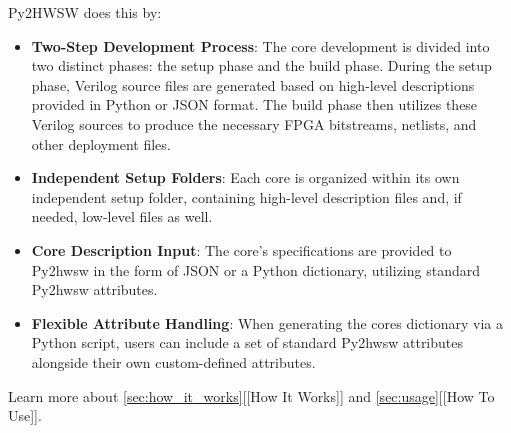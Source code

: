 %

Py2HWSW does this by:
\begin{itemize}
    \item \textbf{Two-Step Development Process}: The core development is divided into two distinct phases: the setup phase and the build phase. During the setup phase, Verilog source files are generated based on high-level descriptions provided in Python or JSON format. The build phase then utilizes these Verilog sources to produce the necessary FPGA bitstreams, netlists, and other deployment files.
    \item \textbf{Independent Setup Folders}: Each core is organized within its own independent setup folder, containing high-level description files and, if needed, low-level files as well.
    \item \textbf{Core Description Input}: The core's specifications are provided to Py2hwsw in the form of JSON or a Python dictionary, utilizing standard Py2hwsw attributes.
    \item \textbf{Flexible Attribute Handling}: When generating the cores dictionary via a Python script, users can include a set of standard Py2hwsw attributes alongside their own custom-defined attributes.
\end{itemize}
Learn more about \ref{sec:how_it_works}[[How It Works]] and \ref{sec:usage}[[How To Use]].
